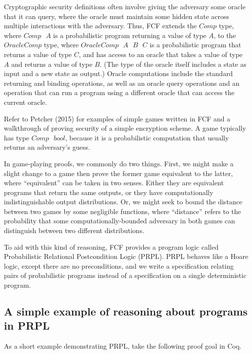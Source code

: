 \documentclass[12pt,lot, lof]{puthesis}
\newcommand{\s} {\textrm{ }}
\begin{document}
Cryptographic security definitions often involve giving the adversary some oracle that it can query, where the oracle must maintain some hidden state across multiple interactions with the adversary. Thus, FCF extends the $Comp$ type, where $Comp \s A$ is a probabilistic program returning a value of type $A$, to the $OracleComp$ type, where $OracleComp \s A \s B \s C$ is a probabilistic program that returns a value of type $C$, and has access to an oracle that takes a value of type $A$ and returns a value of type $B$. (The type of the oracle itself includes a state as input and a new state as output.) Oracle computations include the standard returning and binding operations, as well as an oracle query operations and an operation that can run a program using a different oracle that can access the current oracle.

Refer to Petcher (2015) for examples of simple games written in FCF and a walkthrough of proving security of a simple encryption scheme. A game typically has type $Comp \s bool$, because it is a probabilistic computation that usually returns an adversary's guess.

In game-playing proofs, we commonly do two things. First, we might make a slight change to a game then prove the former game equivalent to the latter, where ``equivalent'' can be taken in two senses. Either they are equivalent programs that return the same outputs, or they have computationally indistinguishable output distributions. Or, we might seek to bound the distance between two games by some negligible functions, where ``distance'' refers to the probability that some computationally-bounded adversary in both games can distinguish between two different distributions.

To aid with this kind of reasoning, FCF provides a program logic called Probabilistic Relational Postcondition Logic (PRPL). PRPL behaves like a Hoare logic, except there are no preconditions, and we write a specification relating pairs of probabilistic programs instead of a specification on a single deterministic program.

\subsection{A simple example of reasoning about programs in PRPL} \label{sec:a_simple_example_of_reasoning_about_programs_in_prpl}

As a short example demonstrating PRPL, take the following proof goal in Coq. 
\end{document}
